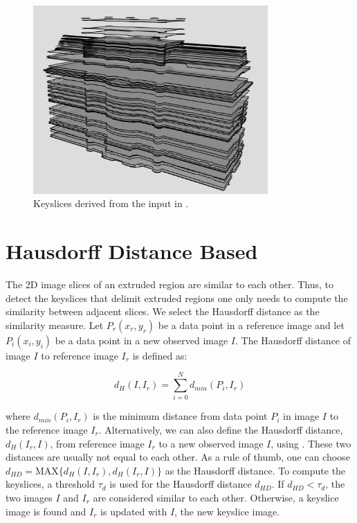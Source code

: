 \begin{figure}[hbtp]
\centering
\includegraphics[width=0.8\textwidth]{figures/keyslice_wireframe.png}
\caption{Keyslices derived from the input in .}
\label{fig:keyslices}
\end{figure}

\section{Hausdorff Distance Based}
\label{sec:ksd}
The 2D image slices of an extruded region are similar to each other.
Thus, to detect the keyslices that delimit extruded regions one only needs
to compute the similarity between adjacent slices.
We select the Hausdorff distance \cite{IR_HKR} as the similarity measure.
Let $P_r(x_r, y_r)$ be a data point in a reference image and
let $P_i(x_i, y_i)$ be a data point in a new observed image $I$.
The Hausdorff distance of image $I$ to reference image $I_r$ is defined as:

\begin{equation}
d_H(I, I_r) = \sum_{i=0}^Nd_{min}(P_i, I_r)
\label{eq:hd}
\end{equation}

where $d_{min}(P_i, I_r)$ is the minimum distance from data point $P_i$
in image $I$ to the reference image $I_r$.
Alternatively, we can also define the Hausdorff distance, $d_H(I_r, I)$,
from reference image $I_r$ to a new observed image $I$, using .
These two distances are usually not equal to each other.
As a rule of thumb, one can choose
$d_{HD} = \text{MAX}\{d_H(I, I_r), d_H(I_r, I)\}$ as the Hausdorff distance.
To compute the keyslices, a threshold $\tau_{d}$ is used for the
Hausdorff distance $d_{HD}$.
If $d_{HD} < \tau_{d}$, the two images $I$ and $I_r$ are considered
similar to each other.
Otherwise, a keyslice image is found and $I_r$ is updated with $I$,
the new keyslice image.


